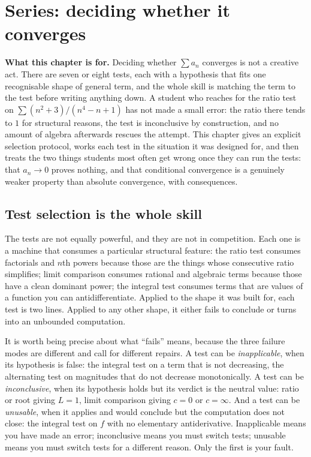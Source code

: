 \chapter{Series: deciding whether it converges}

\begin{orient}
\textbf{What this chapter is for.} Deciding whether $\sum a_n$ converges is not a creative act. There are seven or eight tests, each with a hypothesis that fits one recognisable shape of general term, and the whole skill is matching the term to the test before writing anything down. A student who reaches for the ratio test on $\sum(n^2+3)/(n^4-n+1)$ has not made a small error: the ratio there tends to $1$ for structural reasons, the test is inconclusive by construction, and no amount of algebra afterwards rescues the attempt. This chapter gives an explicit selection protocol, works each test in the situation it was designed for, and then treats the two things students most often get wrong once they can run the tests: that $a_n\to0$ proves nothing, and that conditional convergence is a genuinely weaker property than absolute convergence, with consequences.
\end{orient}

\section{Test selection is the whole skill}

The tests are not equally powerful, and they are not in competition. Each one is a machine that consumes a particular structural feature: the ratio test consumes factorials and $n$th powers because those are the things whose consecutive ratio simplifies; limit comparison consumes rational and algebraic terms because those have a clean dominant power; the integral test consumes terms that are values of a function you can antidifferentiate. Applied to the shape it was built for, each test is two lines. Applied to any other shape, it either fails to conclude or turns into an unbounded computation.

It is worth being precise about what ``fails'' means, because the three failure modes are different and call for different repairs. A test can be \emph{inapplicable}, when its hypothesis is false: the integral test on a term that is not decreasing, the alternating test on magnitudes that do not decrease monotonically. A test can be \emph{inconclusive}, when its hypothesis holds but its verdict is the neutral value: ratio or root giving $L=1$, limit comparison giving $c=0$ or $c=\infty$. And a test can be \emph{unusable}, when it applies and would conclude but the computation does not close: the integral test on $f$ with no elementary antiderivative. Inapplicable means you have made an error; inconclusive means you must switch tests; unusable means you must switch tests for a different reason. Only the first is your fault.

